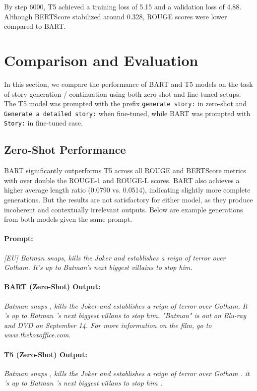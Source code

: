 \documentclass[11pt]{article}
\begin{document}
By step 6000, T5 achieved a training loss of 5.15 and a validation loss of 4.88. Although BERTScore stabilized around 0.328, ROUGE scores were lower compared to BART.



\section{Comparison and Evaluation}

In this section, we compare the performance of BART and T5 models on the task of story generation / continuation using both zero-shot and fine-tuned setups. The T5 model was prompted with the prefix \texttt{generate story:} in zero-shot and \texttt{Generate a detailed story:} when fine-tuned, while BART was prompted with \texttt{Story:} in fine-tuned case.

\subsection{Zero-Shot Performance}

BART significantly outperforms T5 across all ROUGE and BERTScore metrics with over double the ROUGE-1 and ROUGE-L scores. BART also achieves a higher average length ratio (0.0790 vs. 0.0514), indicating slightly more complete generations. But the results are not satisfactory for either model, as they produce incoherent and contextually irrelevant outputs.
Below are example generations from both models given the same prompt.

\paragraph{Prompt:}
\textit{[EU] Batman snaps, kills the Joker and establishes a reign of terror over Gotham. It's up to Batman's next biggest villains to stop him.}

\paragraph{BART (Zero-Shot) Output:}
\textit{Batman snaps , kills the Joker and establishes a reign of terror over Gotham. It 's up to Batman 's next biggest villans to stop him. "Batman" is out on Blu-ray and DVD on September 14. For more information on the film, go to www.theboxoffice.com.}

\paragraph{T5 (Zero-Shot) Output:}
\textit{Batman snaps , kills the Joker and establishes a reign of terror over Gotham . it 's up to Batman 's next biggest villans to stop him .}
\end{document}
